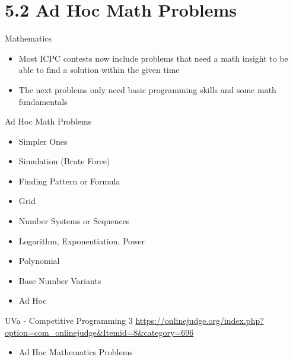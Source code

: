 \documentclass{beamer}
\begin{document}
\section{5.2 Ad Hoc Math Problems}

\begin{frame}{Mathematics}
    \begin{itemize}
        \item Most ICPC contests now include problems that need a math insight to be able to find a solution within the given time
        \item The next problems only need basic programming skills and some math fundamentals
    \end{itemize}
\end{frame}

\begin{frame}{Ad Hoc Math Problems}
    \begin{itemize}
        \item Simpler Ones
        \item Simulation (Brute Force)
        \item Finding Pattern or Formula
        \item Grid
        \item Number Systems or Sequences
        \item Logarithm, Exponentiation, Power
        \item Polynomial
        \item Base Number Variants
        \item Ad Hoc
    \end{itemize}
\end{frame}

\begin{frame}{UVa - Competitive Programming 3}
    \url{https://onlinejudge.org/index.php?option=com_onlinejudge&Itemid=8&category=696}
    \begin{itemize}
        \item Ad Hoc Mathematics Problems
    \end{itemize}
\end{frame}


\end{document}
